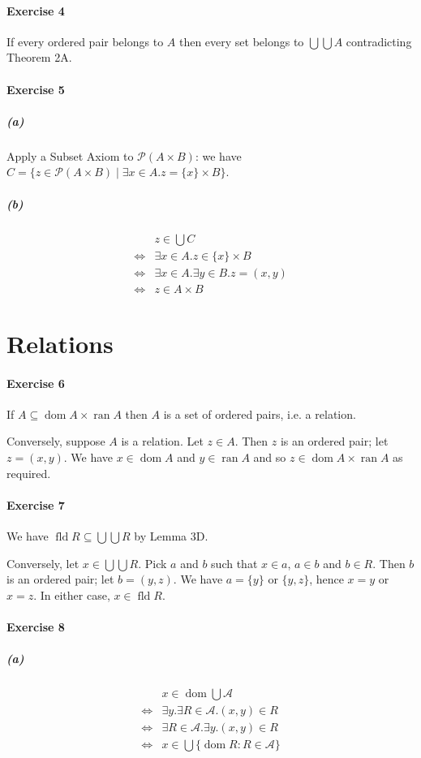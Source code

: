 \documentclass{report}
\newcommand{\dom}{\ensuremath{\operatorname{dom}}}
\newcommand{\ran}{\ensuremath{\operatorname{ran}}}
\newcommand{\fld}{\ensuremath{\operatorname{fld}}}
\begin{document}
    \paragraph{Exercise 4}
    If every ordered pair belongs to $A$ then every set belongs to $\bigcup \bigcup A$ contradicting
    Theorem 2A.

    \paragraph{Exercise 5}
    \subparagraph{(a)}
    Apply a Subset Axiom to $\mathcal{P}(A \times B)$: we have 
    $C = \{ z \in \mathcal{P}(A \times B) \mid \exists x \in A. z = \{x\} \times B \}$.
    \subparagraph{(b)}
    \begin{align*}
        & z \in \bigcup C \\
        \Leftrightarrow & \exists x \in A. z \in \{x\} \times B \\
        \Leftrightarrow & \exists x \in A. \exists y \in B. z = (x,y) \\
        \Leftrightarrow & z \in A \times B
    \end{align*}

    \section{Relations}

    \paragraph{Exercise 6}
    If $A \subseteq \dom A \times \ran A$ then $A$ is a set of ordered pairs, i.e. a relation.

    Conversely, suppose $A$ is a relation. Let $z \in A$. Then $z$ is an ordered pair; let $z = (x,y)$.
    We have $x \in \dom A$ and $y \in \ran A$ and so $z \in \dom A \times \ran A$ as required.

    \paragraph{Exercise 7}
    We have $\fld R \subseteq \bigcup \bigcup R$ by Lemma 3D.

    Conversely, let $x \in \bigcup \bigcup R$. Pick $a$ and $b$ such that $x \in a$, $a \in b$ and $b \in R$.
    Then $b$ is an ordered pair; let $b = (y,z)$. We have $a = \{y\}$ or $\{y,z\}$, hence $x = y$ or
    $x = z$. In either case, $x \in \fld R$.

    \paragraph{Exercise 8}
    \subparagraph{(a)}
    \begin{align*}
        & x \in \dom \bigcup \mathcal{A} \\
        \Leftrightarrow & \exists y. \exists R \in \mathcal{A}. (x,y) \in R \\
        \Leftrightarrow & \exists R \in \mathcal{A}. \exists y. (x,y) \in R \\
        \Leftrightarrow & x \in \bigcup \{ \dom R : R \in \mathcal{A} \}
    \end{align*}
\end{document}
